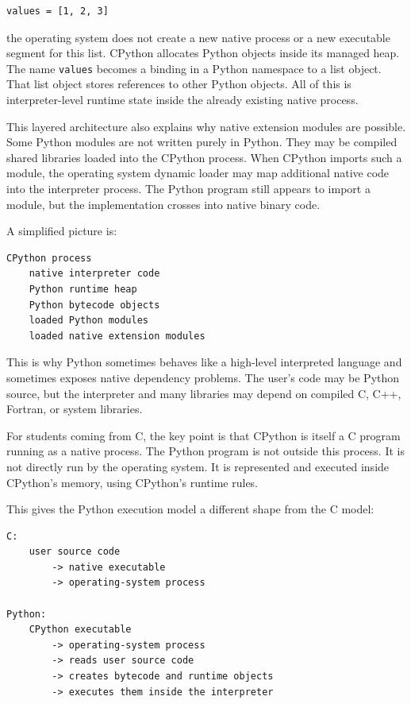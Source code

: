 \documentclass[a4paper,twoside]{report}
\begin{document}
\begin{verbatim}
values = [1, 2, 3]
\end{verbatim}

the operating system does not create a new native process or a new executable segment for this list. CPython allocates Python objects inside its managed heap. The name \texttt{values} becomes a binding in a Python namespace to a list object. That list object stores references to other Python objects. All of this is interpreter-level runtime state inside the already existing native process.

This layered architecture also explains why native extension modules are possible. Some Python modules are not written purely in Python. They may be compiled shared libraries loaded into the CPython process. When CPython imports such a module, the operating system dynamic loader may map additional native code into the interpreter process. The Python program still appears to import a module, but the implementation crosses into native binary code.

A simplified picture is:

\begin{verbatim}
CPython process
    native interpreter code
    Python runtime heap
    Python bytecode objects
    loaded Python modules
    loaded native extension modules
\end{verbatim}

This is why Python sometimes behaves like a high-level interpreted language and sometimes exposes native dependency problems. The user's code may be Python source, but the interpreter and many libraries may depend on compiled C, C++, Fortran, or system libraries.

For students coming from C, the key point is that CPython is itself a C program running as a native process. The Python program is not outside this process. It is not directly run by the operating system. It is represented and executed inside CPython's memory, using CPython's runtime rules.

This gives the Python execution model a different shape from the C model:

\begin{verbatim}
C:
    user source code
        -> native executable
        -> operating-system process

Python:
    CPython executable
        -> operating-system process
        -> reads user source code
        -> creates bytecode and runtime objects
        -> executes them inside the interpreter
\end{verbatim}
\end{document}
